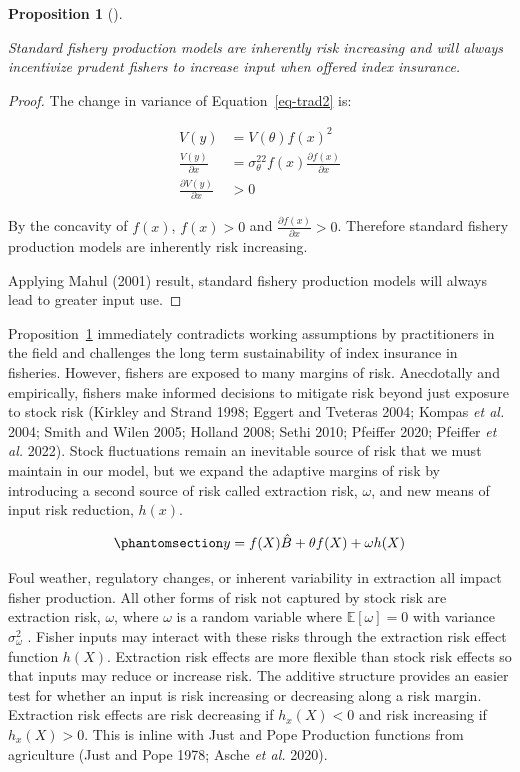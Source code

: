 \documentclass[
  letterpaper,
  DIV=11,
  numbers=noendperiod]{scrartcl}
\theoremstyle{plain}
\theoremstyle{plain}
\newtheorem{proposition}{Proposition}[section]
\theoremstyle{remark}
\begin{document}
\begin{proposition}[]\protect\hypertarget{prp-trad}{}\label{prp-trad}

Standard fishery production models are inherently risk increasing and
will always incentivize prudent fishers to increase input when offered
index insurance.

\end{proposition}

\begin{proof}
The change in variance of Equation~\ref{eq-trad2} is:

\[
\begin{aligned}
V(y)&=V(\theta)f(x)^2 \\
\frac{V(y)}{\partial x}&=\sigma_\theta^22f(x)\frac{\partial f(x)}{\partial x}\\
\frac{\partial V(y)}{\partial x}&>0
\end{aligned}
\]

By the concavity of \(f(x)\), \(f(x)>0\) and
\(\frac{\partial f(x)}{\partial x}>0\). Therefore standard fishery
production models are inherently risk increasing.

Applying Mahul (2001) result, standard fishery production models will
always lead to greater input use.
\end{proof}

Proposition~\ref{prp-trad} immediately contradicts working assumptions
by practitioners in the field and challenges the long term
sustainability of index insurance in fisheries. However, fishers are
exposed to many margins of risk. Anecdotally and empirically, fishers
make informed decisions to mitigate risk beyond just exposure to stock
risk (Kirkley and Strand 1998; Eggert and Tveteras 2004; Kompas \emph{et
al.} 2004; Smith and Wilen 2005; Holland 2008; Sethi 2010; Pfeiffer
2020; Pfeiffer \emph{et al.} 2022). Stock fluctuations remain an
inevitable source of risk that we must maintain in our model, but we
expand the adaptive margins of risk by introducing a second source of
risk called extraction risk, \(\omega\), and new means of input risk
reduction, \(h(x)\).

\begin{equation}\phantomsection\label{eq-jpfish}{
y=f(X)\hat{B}+\theta f(X)+\omega h(X)
}\end{equation}

Foul weather, regulatory changes, or inherent variability in extraction
all impact fisher production. All other forms of risk not captured by
stock risk are extraction risk, \(\omega\), where \(\omega\) is a random
variable where \(\mathbb{E}[\omega]=0\) with variance
\(\sigma_\omega^2\) . Fisher inputs may interact with these risks
through the extraction risk effect function \(h(X)\). Extraction risk
effects are more flexible than stock risk effects so that inputs may
reduce or increase risk. The additive structure provides an easier test
for whether an input is risk increasing or decreasing along a risk
margin. Extraction risk effects are risk decreasing if \(h_x(X)<0\) and
risk increasing if \(h_x(X)>0\). This is inline with Just and Pope
Production functions from agriculture (Just and Pope 1978; Asche
\emph{et al.} 2020).
\end{document}
